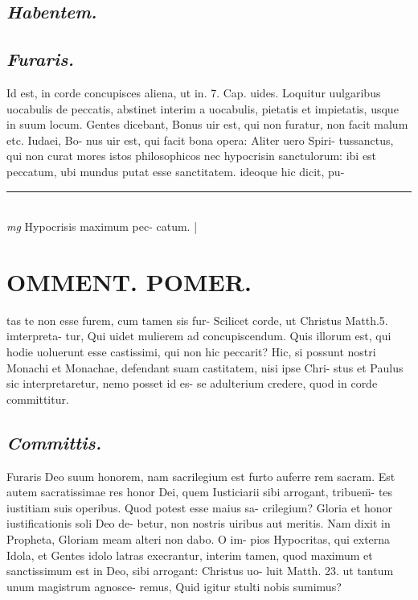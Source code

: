\documentclass{article}
\begin{document}
\begin{pages}
\subsection*{\textit{Habentem. }}
{}
\subsection*{\textit{Furaris. }}\pstart Id est, in corde concupisces aliena, ut in. 7. Cap.  uides. Loquitur uulgaribus uocabulis de peccatis, abstinet interim a uocabulis, pietatis et impietatis, usque in suum locum. Gentes dicebant, Bonus uir est, qui non furatur, non facit malum etc. Iudaei, Bo- nus uir est, qui facit bona opera: Aliter uero Spiri- tussanctus, qui non curat mores istos philosophicos nec hypocrisin sanctulorum: ibi est peccatum, ubi mundus putat esse sanctitatem. ideoque hic dicit, pu-  \pend
\vspace{0.5cm}\noindent
\vspace{0.2cm}\rule{1cm}{0.2pt}\\ 
\hspace{0.2cm}\textit{mg}
\footnotesize Hypocrisis maximum pec- catum.  
\normalsize| 
\section*{OMMENT. POMER.  }\pstart tas te non esse furem, cum tamen sis fur-  \pend\pstart Scilicet corde, ut Christus Matth.5. imterpreta- tur, Qui uidet mulierem ad concupiscendum. Quis illorum est, qui hodie uoluerunt esse castissimi, qui non hic peccarit? Hic, si possunt nostri Monachi et Monachae, defendant suam castitatem, nisi ipse Chri- stus et Paulus sic interpretaretur, nemo posset id es- se adulterium credere, quod in corde committitur.   \pend
{}
{}
\subsection*{\textit{Committis. }}\pstart Furaris Deo suum honorem, nam sacrilegium est furto auferre rem sacram. Est autem sacratissimae res honor Dei, quem Iusticiarii sibi arrogant, tribuem̈- tes iustitiam suis operibus. Quod potest esse maius sa- crilegium? Gloria et honor iustificationis soli Deo de- betur, non nostris uiribus aut meritis. Nam dixit in Propheta, Gloriam meam alteri non dabo. O im- pios Hypocritas, qui externa Idola, et Gentes idolo latras execrantur, interim tamen, quod maximum et sanctissimum est in Deo, sibi arrogant: Christus uo- luit Matth. 23. ut tantum unum magistrum agnosce- remus, Quid igitur stulti nobis sumimus?  \pend
{}
{}

\end{pages}
\end{document}
